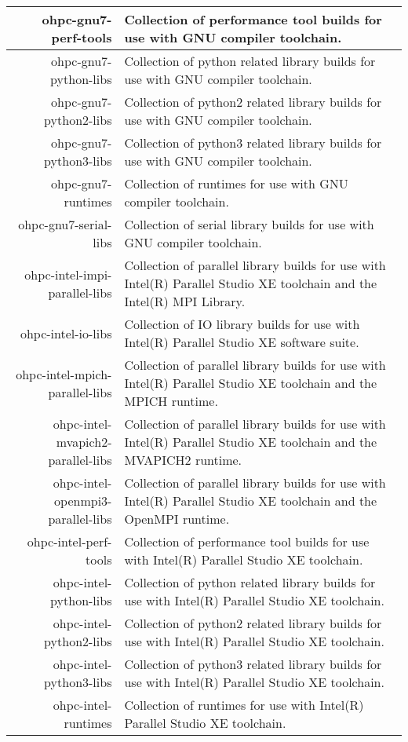 \begin{tabularx}{\textwidth}{r|X}
\hline
ohpc-gnu7-perf-tools & Collection of performance tool builds for use with GNU compiler toolchain. \\ 
\hline
ohpc-gnu7-python-libs & Collection of python related library builds for use with GNU compiler toolchain. \\ 
\hline
ohpc-gnu7-python2-libs & Collection of python2 related library builds for use with GNU compiler toolchain. \\ 
\hline
ohpc-gnu7-python3-libs & Collection of python3 related library builds for use with GNU compiler toolchain. \\ 
\hline
ohpc-gnu7-runtimes & Collection of runtimes for use with GNU compiler toolchain. \\ 
\hline
ohpc-gnu7-serial-libs & Collection of serial library builds for use with GNU compiler toolchain. \\ 
\hline
ohpc-intel-impi-parallel-libs & Collection of parallel library builds for use with Intel(R) Parallel Studio XE toolchain and the Intel(R) MPI Library. \\ 
\hline
ohpc-intel-io-libs & Collection of IO library builds for use with Intel(R) Parallel Studio XE software suite. \\ 
\hline
ohpc-intel-mpich-parallel-libs & Collection of parallel library builds for use with Intel(R) Parallel Studio XE toolchain and the MPICH runtime. \\ 
\hline
ohpc-intel-mvapich2-parallel-libs & Collection of parallel library builds for use with Intel(R) Parallel Studio XE toolchain and the MVAPICH2 runtime. \\ 
\hline
ohpc-intel-openmpi3-parallel-libs & Collection of parallel library builds for use with Intel(R) Parallel Studio XE toolchain and the OpenMPI runtime. \\ 
\hline
ohpc-intel-perf-tools & Collection of performance tool builds for use with Intel(R) Parallel Studio XE toolchain. \\ 
\hline
ohpc-intel-python-libs & Collection of python related library builds for use with Intel(R) Parallel Studio XE toolchain. \\ 
\hline
ohpc-intel-python2-libs & Collection of python2 related library builds for use with Intel(R) Parallel Studio XE toolchain. \\ 
\hline
ohpc-intel-python3-libs & Collection of python3 related library builds for use with Intel(R) Parallel Studio XE toolchain. \\ 
\hline
ohpc-intel-runtimes & Collection of runtimes for use with Intel(R) Parallel Studio XE toolchain. \\ 

\end{tabularx}
